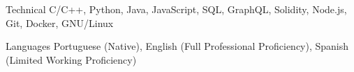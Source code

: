 
\begin{cvskills}
  \cvskill
    {Technical} %
    {C/C++, Python, Java, JavaScript, SQL, GraphQL, Solidity, Node.js, Git, Docker, GNU/Linux} %

  \cvskill
    {Languages} %
    {Portuguese (Native), English (Full Professional Proficiency), Spanish (Limited Working Proficiency)} %

\end{cvskills}
